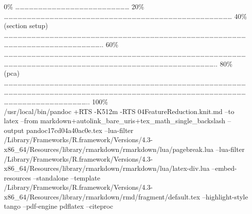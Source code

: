 \documentclass[
]{article}
\begin{document}
\textbar{} \textbar{} \textbar{} 0\% \textbar{}
\textbar\ldots\ldots\ldots\ldots\ldots\ldots\ldots\ldots\ldots\ldots\ldots\ldots\ldots\ldots\ldots\ldots\ldots\ldots\ldots\ldots\ldots\ldots\ldots\ldots\ldots{}
\textbar{} 20\% \textbar{}
\textbar\ldots\ldots\ldots\ldots\ldots\ldots\ldots\ldots\ldots\ldots\ldots\ldots\ldots\ldots\ldots\ldots\ldots\ldots\ldots\ldots\ldots\ldots\ldots\ldots\ldots\ldots\ldots\ldots\ldots\ldots\ldots\ldots\ldots\ldots\ldots\ldots\ldots\ldots\ldots\ldots\ldots\ldots\ldots\ldots\ldots\ldots\ldots\ldots\ldots\ldots{}
\textbar{} 40\% (section setup) \textbar{}
\textbar\ldots\ldots\ldots\ldots\ldots\ldots\ldots\ldots\ldots\ldots\ldots\ldots\ldots\ldots\ldots\ldots\ldots\ldots\ldots\ldots\ldots\ldots\ldots\ldots\ldots\ldots\ldots\ldots\ldots\ldots\ldots\ldots\ldots\ldots\ldots\ldots\ldots\ldots\ldots\ldots\ldots\ldots\ldots\ldots\ldots\ldots\ldots\ldots\ldots\ldots\ldots\ldots\ldots\ldots\ldots\ldots\ldots\ldots\ldots\ldots\ldots\ldots\ldots\ldots\ldots\ldots\ldots\ldots\ldots\ldots\ldots\ldots\ldots\ldots..
\textbar{} 60\% \textbar{}
\textbar\ldots\ldots\ldots\ldots\ldots\ldots\ldots\ldots\ldots\ldots\ldots\ldots\ldots\ldots\ldots\ldots\ldots\ldots\ldots\ldots\ldots\ldots\ldots\ldots\ldots\ldots\ldots\ldots\ldots\ldots\ldots\ldots\ldots\ldots\ldots\ldots\ldots\ldots\ldots\ldots\ldots\ldots\ldots\ldots\ldots\ldots\ldots\ldots\ldots\ldots\ldots\ldots\ldots\ldots\ldots\ldots\ldots\ldots\ldots\ldots\ldots\ldots\ldots\ldots\ldots\ldots\ldots\ldots\ldots\ldots\ldots\ldots\ldots\ldots\ldots\ldots\ldots\ldots\ldots\ldots\ldots\ldots\ldots\ldots\ldots\ldots\ldots\ldots\ldots\ldots\ldots\ldots\ldots\ldots\ldots\ldots\ldots\ldots\ldots..
\textbar{} 80\% (pca) \textbar{}
\textbar\ldots\ldots\ldots\ldots\ldots\ldots\ldots\ldots\ldots\ldots\ldots\ldots\ldots\ldots\ldots\ldots\ldots\ldots\ldots\ldots\ldots\ldots\ldots\ldots\ldots\ldots\ldots\ldots\ldots\ldots\ldots\ldots\ldots\ldots\ldots\ldots\ldots\ldots\ldots\ldots\ldots\ldots\ldots\ldots\ldots\ldots\ldots\ldots\ldots\ldots\ldots\ldots\ldots\ldots\ldots\ldots\ldots\ldots\ldots\ldots\ldots\ldots\ldots\ldots\ldots\ldots\ldots\ldots\ldots\ldots\ldots\ldots\ldots\ldots\ldots\ldots\ldots\ldots\ldots\ldots\ldots\ldots\ldots\ldots\ldots\ldots\ldots\ldots\ldots\ldots\ldots\ldots\ldots\ldots\ldots\ldots\ldots\ldots\ldots\ldots\ldots\ldots\ldots\ldots\ldots\ldots\ldots\ldots\ldots\ldots\ldots\ldots\ldots\ldots\ldots\ldots\ldots\ldots\ldots\ldots\ldots\ldots\ldots\ldots..\textbar{}
100\%\\
/usr/local/bin/pandoc +RTS -K512m -RTS 04FeatureReduction.knit.md --to
latex --from markdown+autolink\_bare\_uris+tex\_math\_single\_backslash
--output pandoc17cd04a40ac0e.tex --lua-filter
/Library/Frameworks/R.framework/Versions/4.3-x86\_64/Resources/library/rmarkdown/rmarkdown/lua/pagebreak.lua
--lua-filter
/Library/Frameworks/R.framework/Versions/4.3-x86\_64/Resources/library/rmarkdown/rmarkdown/lua/latex-div.lua
--embed-resources --standalone --template
/Library/Frameworks/R.framework/Versions/4.3-x86\_64/Resources/library/rmarkdown/rmd/fragment/default.tex
--highlight-style tango --pdf-engine pdflatex --citeproc
\end{document}
